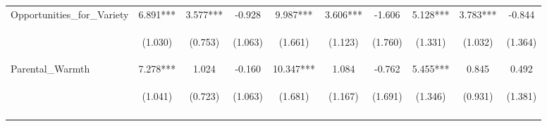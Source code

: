 \begin{tabular}{lccccccccc}
\noalign{\smallskip}Opportunities_for_Variety & 6.891*** & 3.577*** & -0.928 & 9.987*** & 3.606*** & -1.606 & 5.128*** & 3.783*** & -0.844\\
 & \begin{footnotesize}(1.030)\end{footnotesize} & \begin{footnotesize}(0.753)\end{footnotesize} & \begin{footnotesize}(1.063)\end{footnotesize} & \begin{footnotesize}(1.661)\end{footnotesize} & \begin{footnotesize}(1.123)\end{footnotesize} & \begin{footnotesize}(1.760)\end{footnotesize} & \begin{footnotesize}(1.331)\end{footnotesize} & \begin{footnotesize}(1.032)\end{footnotesize} & \begin{footnotesize}(1.364)\end{footnotesize}\\
\noalign{\smallskip}Parental_Warmth & 7.278*** & 1.024 & -0.160 & 10.347*** & 1.084 & -0.762 & 5.455*** & 0.845 & 0.492\\
 & \begin{footnotesize}(1.041)\end{footnotesize} & \begin{footnotesize}(0.723)\end{footnotesize} & \begin{footnotesize}(1.063)\end{footnotesize} & \begin{footnotesize}(1.681)\end{footnotesize} & \begin{footnotesize}(1.167)\end{footnotesize} & \begin{footnotesize}(1.691)\end{footnotesize} & \begin{footnotesize}(1.346)\end{footnotesize} & \begin{footnotesize}(0.931)\end{footnotesize} & \begin{footnotesize}(1.381)\end{footnotesize}\\
\noalign{\smallskip}\hline\end{tabular}\\
